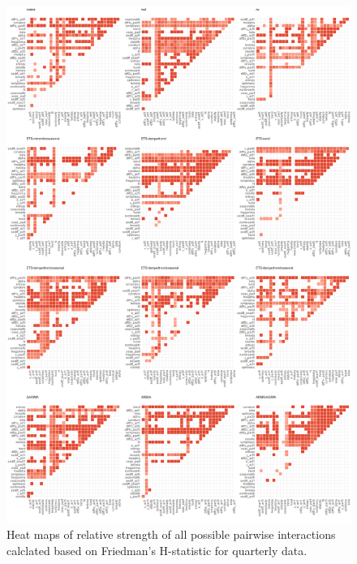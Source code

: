 \documentclass[11pt,a4paper,]{article}
\begin{document}
\begin{figure}
\centering
\includegraphics{figures/friedmanQ-1.png}
\caption{\label{fig:friedmanQ}Heat maps of relative strength of all possible
pairwise interactions calclated based on Friedman's H-statistic for
quarterly data.}
\end{figure}

\newpage
\end{document}
